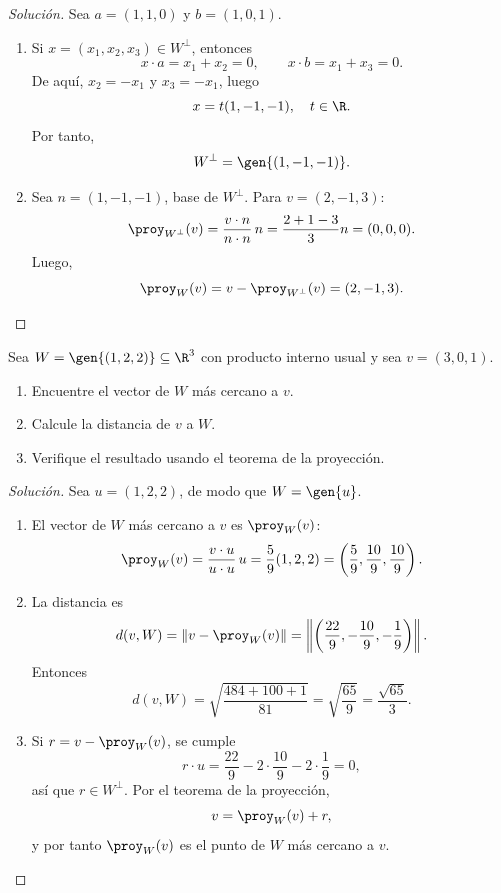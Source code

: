 \documentclass[a4,11pt]{aleph-notas}
\begin{document}
\begin{proof}[Solución]\hspace{0pt}
    Sea $a=(1,1,0)$ y $b=(1,0,1)$.
    \begin{enumerate}
        \item Si $x=(x_1,x_2,x_3)\in W^\perp$, entonces
        \[
            x\cdot a=x_1+x_2=0,
            \qquad
            x\cdot b=x_1+x_3=0.
        \]
        De aquí, $x_2=-x_1$ y $x_3=-x_1$, luego
        \[
            x=t(1,-1,-1),\quad t\in\R.
        \]
        Por tanto,
        \[
            W^\perp=\gen\{(1,-1,-1)\}.
        \]
        \item Sea $n=(1,-1,-1)$, base de $W^\perp$. Para $v=(2,-1,3)$:
        \[
            \proy_{W^\perp}(v)=\frac{v\cdot n}{n\cdot n}\,n
            =\frac{2+1-3}{3}n=(0,0,0).
        \]
        Luego,
        \[
            \proy_W(v)=v-\proy_{W^\perp}(v)=(2,-1,3).
        \]
    \end{enumerate}
\end{proof}

\begin{ejer}
    Sea $W=\gen\{(1,2,2)\}\subseteq \R^3$ con producto interno usual y sea $v=(3,0,1)$.
    \begin{enumerate}
        \item Encuentre el vector de $W$ más cercano a $v$.
        \item Calcule la distancia de $v$ a $W$.
        \item Verifique el resultado usando el teorema de la proyección.
    \end{enumerate}
\end{ejer}

\begin{proof}[Solución]\hspace{0pt}
    Sea $u=(1,2,2)$, de modo que $W=\gen\{u\}$.
    \begin{enumerate}
        \item El vector de $W$ más cercano a $v$ es $\proy_W(v)$:
        \[
            \proy_W(v)=\frac{v\cdot u}{u\cdot u}\,u
            =\frac{5}{9}(1,2,2)
            =\left(\frac59,\frac{10}9,\frac{10}9\right).
        \]
        \item La distancia es
        \[
            d(v,W)=\|v-\proy_W(v)\|
            =\left\|\left(\frac{22}9,-\frac{10}9,-\frac19\right)\right\|.
        \]
        Entonces
        \[
            d(v,W)=\sqrt{\frac{484+100+1}{81}}=\sqrt{\frac{65}{9}}=\frac{\sqrt{65}}{3}.
        \]
        \item Si $r=v-\proy_W(v)$, se cumple
        \[
            r\cdot u=\frac{22}9-2\cdot\frac{10}9-2\cdot\frac19=0,
        \]
        así que $r\in W^\perp$. Por el teorema de la proyección,
        \[
            v=\proy_W(v)+r,
        \]
        y por tanto $\proy_W(v)$ es el punto de $W$ más cercano a $v$.
    \end{enumerate}
\end{proof}
\end{document}
